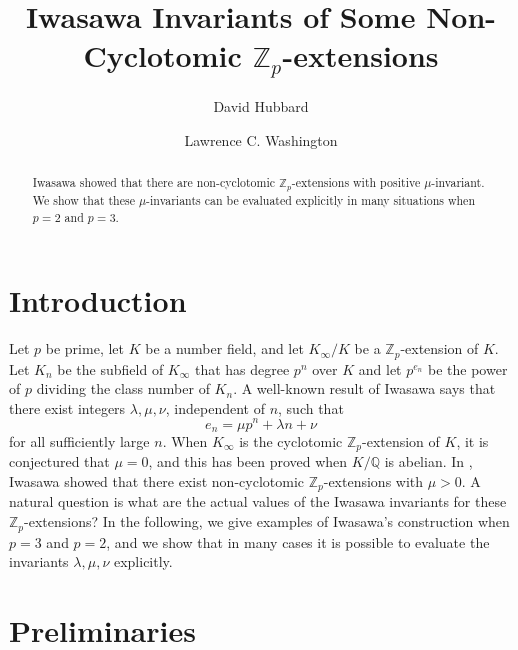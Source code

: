 \documentclass{amsart}
\begin{document}
\title{Iwasawa Invariants of Some Non-Cyclotomic $\mathbb Z_p$-extensions}
\author{David Hubbard}
\address{35 Holt Circle,  Hamilton, NJ 08619}
\author{Lawrence C. Washington}
\address{Department of Mathematics,
University of Maryland,
College Park, MD 20742}


\begin{abstract}Iwasawa showed that there are non-cyclotomic $\mathbb Z_p$-extensions with
positive $\mu$-invariant. We show that these $\mu$-invariants can be evaluated explicitly in many situations
when $p=2$ and $p=3$.\end{abstract}
\maketitle

\section{Introduction}
Let $p$ be prime, let $K$ be a number field, and let $K_{\infty}/K$ be a $\mathbb Z_p$-extension of $K$.
Let $K_n$ be the subfield of $K_{\infty}$ that has degree $p^n$ over $K$ and let $p^{e_n}$
be the power of $p$ dividing the class number of $K_n$.
A well-known result of Iwasawa says that there exist integers $\lambda, \mu, \nu$, independent of $n$, 
such that
$$
e_n=\mu p^n +\lambda n + \nu
$$
for all sufficiently large $n$. When $K_{\infty}$ is the cyclotomic $\mathbb Z_p$-extension of $K$,
it is conjectured that $\mu=0$, and this has been proved \cite{FW} when $K/\mathbb Q$ is abelian.
In \cite{Iw}, Iwasawa showed that there exist non-cyclotomic $\mathbb Z_p$-extensions with $\mu>0$.
A natural question is what are the actual values of the Iwasawa invariants for these $\mathbb Z_p$-extensions?
In the following, we give examples of Iwasawa's construction when $p=3$ and $p=2$, and we show that in many cases it is possible to evaluate
the invariants $\lambda, \mu, \nu$ explicitly.

\section{Preliminaries}\label{SectPrelim}
\end{document}
